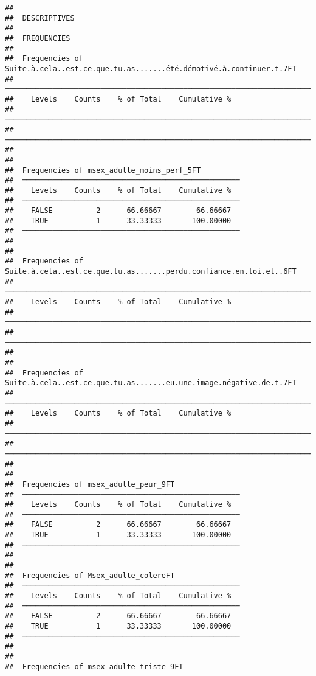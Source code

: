 \documentclass[
]{article}
\begin{document}
\begin{verbatim}
## 
##  DESCRIPTIVES
## 
##  FREQUENCIES
## 
##  Frequencies of Suite.à.cela..est.ce.que.tu.as.......été.démotivé.à.continuer.t.7FT 
##  ────────────────────────────────────────────────────────────────────────────────── 
##    Levels    Counts    % of Total    Cumulative %   
##  ────────────────────────────────────────────────────────────────────────────────── 
##  ────────────────────────────────────────────────────────────────────────────────── 
## 
## 
##  Frequencies of msex_adulte_moins_perf_5FT          
##  ────────────────────────────────────────────────── 
##    Levels    Counts    % of Total    Cumulative %   
##  ────────────────────────────────────────────────── 
##    FALSE          2      66.66667        66.66667   
##    TRUE           1      33.33333       100.00000   
##  ────────────────────────────────────────────────── 
## 
## 
##  Frequencies of Suite.à.cela..est.ce.que.tu.as.......perdu.confiance.en.toi.et..6FT 
##  ────────────────────────────────────────────────────────────────────────────────── 
##    Levels    Counts    % of Total    Cumulative %   
##  ────────────────────────────────────────────────────────────────────────────────── 
##  ────────────────────────────────────────────────────────────────────────────────── 
## 
## 
##  Frequencies of Suite.à.cela..est.ce.que.tu.as.......eu.une.image.négative.de.t.7FT 
##  ────────────────────────────────────────────────────────────────────────────────── 
##    Levels    Counts    % of Total    Cumulative %   
##  ────────────────────────────────────────────────────────────────────────────────── 
##  ────────────────────────────────────────────────────────────────────────────────── 
## 
## 
##  Frequencies of msex_adulte_peur_9FT                
##  ────────────────────────────────────────────────── 
##    Levels    Counts    % of Total    Cumulative %   
##  ────────────────────────────────────────────────── 
##    FALSE          2      66.66667        66.66667   
##    TRUE           1      33.33333       100.00000   
##  ────────────────────────────────────────────────── 
## 
## 
##  Frequencies of Msex_adulte_colereFT                
##  ────────────────────────────────────────────────── 
##    Levels    Counts    % of Total    Cumulative %   
##  ────────────────────────────────────────────────── 
##    FALSE          2      66.66667        66.66667   
##    TRUE           1      33.33333       100.00000   
##  ────────────────────────────────────────────────── 
## 
## 
##  Frequencies of msex_adulte_triste_9FT              

\end{verbatim}
\end{document}
